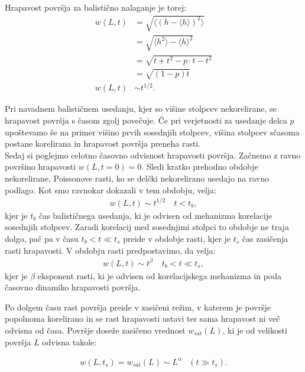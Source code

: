 \documentclass[a4paper, twoside, 12pt]{book}
\begin{document}
Hrapavost površja za balistično nalaganje je torej:
\begin{align}
  w(L,t) &= \sqrt{\langle (h - \langle h \rangle)^2\rangle} \\
  &= \sqrt{\langle h^2 \rangle - \langle h \rangle^2} \\
  &= \sqrt{t + t^2 - p \cdot t - t^2} \\
  &= \sqrt{(1-p)t} \\
  w(L,t) &\sim t^{1/2}.
\end{align}

Pri navadnem balističnem usedanju, kjer so višine stolpcev nekorelirane, se hrapavost površja s časom zgolj povečuje. Če pri verjetnosti za usedanje delca $p$ upoštevamo še na primer višino prvih sosednjih stolpcev, višina stolpcev sčasoma postane korelirana in hrapavost površja preneha rasti. \\
Sedaj si poglejmo celotno časovno odvisnost hrapavosti površja. Začnemo z ravno površino hrapavosti $w(L,t=0)=0$. Sledi kratko prehodno obdobje nekorelirane, Poissonove rasti, ko se delčki nekorelirano usedajo na ravno podlago. Kot smo ravnokar dokazali v tem obdobju, velja:
\begin{equation}
  \begin{array}{lr} w(L,t) \sim t^{1/2} & \ t < t_b, \end{array}
\end{equation}
kjer je $t_b$ čas balističnega usedanja, ki je odvisen od mehanizma korelacije sosednjih stolpcev.
Zaradi korelacij med sosednjimi stolpci to obdobje ne traja dolgo, pač pa v času $t_b < t \ll t_s$ preide v obdobje rasti, kjer je $t_s$ čas zasičenja rasti hrapavosti. V obdobju rasti predpostavimo, da velja:
  \begin{equation}
    \begin{array}{lr} w(L,t) \sim t^\beta  & \ t_b < t \ll t_s, \end{array}
    \label{beta}
  \end{equation}
kjer je $\beta$ eksponent rasti, ki je odvisen od korelacijskega mehanizma in poda časovno dinamiko hrapavosti površja.

Po dolgem času rast površja preide v zasičeni režim, v katerem je površje popolnoma korelirano in se rast hrapavosti ustavi ter sama hrapavost ni več odvisna od časa. Površje doseže zasičeno vrednost $w_{sat}(L)$, ki je od velikosti površja $L$ odvisna takole:

  \begin{equation}
    \begin{array}{lr} w(L,t_s) = w_{sat}(L) \sim L^\alpha & (t \gg t_s). \end{array}
    \label{alfa}
  \end{equation}
\end{document}

